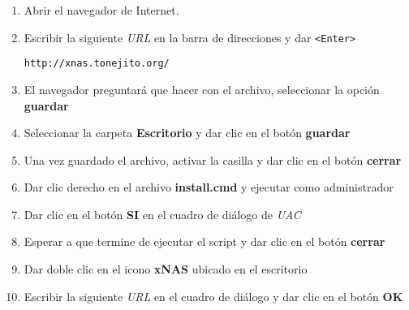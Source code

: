 {
\linespread{0.1}
\begin{enumerate}


  \item Abrir el navegador de Internet.


  \item Escribir la siguiente \textit{URL} en la barra de direcciones y dar \texttt{<Enter>}

    \texttt{http://xnas.tonejito.org/}


  \item El navegador preguntar\'{a} que hacer con el archivo, seleccionar la opci\'{o}n \textbf{guardar}


  \item Seleccionar la carpeta \textbf{Escritorio} y dar clic en el bot\'{o}n \textbf{guardar}


  \item Una vez guardado el archivo, activar la casilla y dar clic en el bot\'{o}n \textbf{cerrar}


  \item Dar clic derecho en el archivo \textbf{install.cmd} y ejecutar como administrador


  \item Dar clic en el bot\'{o}n \textbf{SI} en el cuadro de di\'{a}logo de \textit{UAC}


  \item Esperar a que termine de ejecutar el script y dar clic en el bot\'{o}n \textbf{cerrar}


  \item Dar doble clic en el icono \textbf{xNAS} ubicado en el escritorio


  \item Escribir la siguiente \textit{URL} en el cuadro de di\'{a}logo y dar clic en el bot\'{o}n \textbf{OK}


\end{enumerate}}
